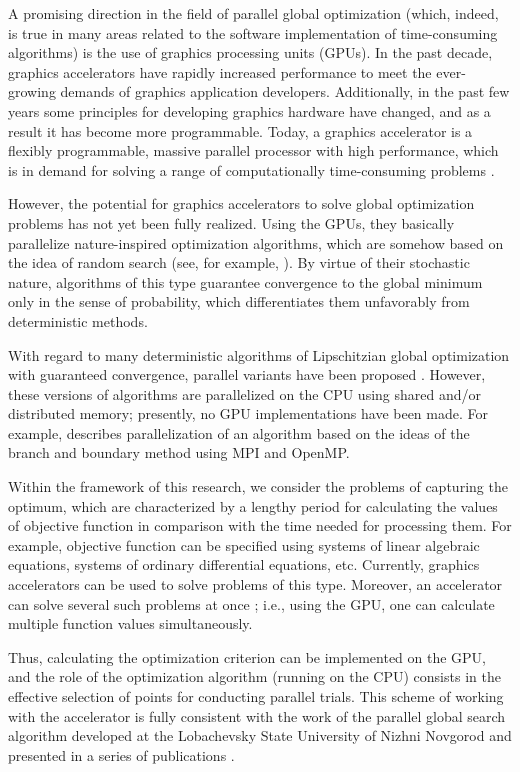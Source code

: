 \documentclass{svproc}
\begin{document}
A promising direction in the field of parallel global optimization (which, indeed, is true in many areas related to the software implementation of time-consuming algorithms) is the use of graphics processing units (GPUs). In the past decade, graphics accelerators have rapidly increased performance to meet the ever-growing demands of graphics application developers. Additionally, in the past few years some principles for developing graphics hardware have changed, and as a result it has become more programmable. Today, a graphics accelerator is a flexibly programmable, massive parallel processor with high performance, which is in demand for solving a range of computationally time-consuming problems \cite{Hwu2011}.

However, the potential for graphics accelerators to solve global optimization problems has not yet been fully realized. Using the GPUs, they basically parallelize nature-inspired optimization algorithms, which are somehow based on the idea of random search (see, for example, \cite{Ferreiro2013,Garcia2014,Langdon2011}). By virtue of their stochastic nature, algorithms of this type guarantee convergence to the global minimum only in the sense of probability, which differentiates them unfavorably from deterministic methods.

With regard to many deterministic algorithms of Lipschitzian global optimization with guaranteed convergence, parallel variants have been proposed \cite{Evtushenko2009,He2008,Paulavicius2011}. However, these versions of algorithms are parallelized on the CPU using shared and/or distributed memory; presently, no GPU implementations have been made. For example, \cite{Paulavicius2011} describes parallelization of an algorithm based on the ideas of the branch and boundary method using MPI and OpenMP.

Within the framework of this research, we consider the problems of capturing the optimum, which are characterized by a lengthy period for calculating the values of objective function in comparison with the time needed for processing them. For example, objective function can be specified using systems of linear algebraic equations, systems of ordinary differential equations, etc. Currently, graphics accelerators can be used to solve problems of this type. Moreover, an accelerator can solve several such problems at once \cite{Kindratenko2014}; i.e., using the GPU, one can calculate multiple function values simultaneously.

Thus, calculating the optimization criterion can be implemented on the GPU, and the role of the optimization algorithm (running on the CPU) consists in the effective selection of points for conducting parallel trials. This scheme of working with the accelerator is fully consistent with the work of the parallel global search algorithm developed at the Lobachevsky State University of Nizhni Novgorod and presented in a series of publications \cite{Barkalov2014,Barkalov2020,Barkalov2019,Grishagin2016,Grishagin2015,Grishagin2018,globalizerSystem}.
\end{document}
